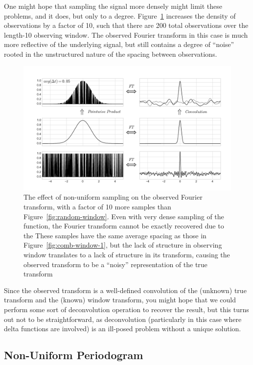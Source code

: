 \documentclass[preprint]{aastex}
\newcommand{\Fig}[1]{Figure~\ref{fig:#1}}
\newcommand{\fig}[1]{Figure~\ref{fig:#1}}
\newcommand{\figlabel}[1]{\label{fig:#1}}
\begin{document}
One might hope that sampling the signal more densely might limit these problems,
and it does, but only to a degree.
\Fig{random-window-2} increases the density of observations by a factor of 10,
such that there are 200 total observations over the length-10 observing window.
The observed Fourier transform in this case is much more reflective of the
underlying signal, but still contains a degree of ``noise'' rooted in the
unstructured nature of the spacing between observations.


\begin{figure}[ht]
  \centering
  \includegraphics[width=\textwidth]{fig11_random_window_2}
  \caption{The effect of non-uniform sampling on the observed Fourier transform,
    with a factor of 10 more samples than \fig{random-window}.
    Even with very dense sampling of the function, the Fourier transform
    cannot be exactly recovered due to the 
    These samples have the same average spacing as those in \fig{comb-window-1},
    but the lack of structure in observing window translates to a lack of
    structure in its transform, causing the observed transform to be a
    ``noisy'' representation of the true transform
    \figlabel{random-window-2}}
\end{figure}

Since the observed transform is a well-defined convolution of the (unknown) true
transform and the (known) window transform, you might hope that we could
perform some sort of deconvolution operation to recover the result, but this
turns out not to be straightforward, as deconvolution (particularly in this
case where delta functions are involved) is an ill-posed problem without a
unique solution.

\subsection{Non-Uniform Periodogram}
\end{document}
